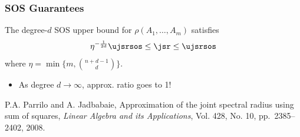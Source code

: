 \documentclass{beamer}
\begin{document}
  \begin{frame}
      \frametitle{SOS Guarantees}
      The degree-$d$ SOS upper bound for $\rho(A_1, \ldots,A_m)$ satisfies
      \[ \eta^{-\frac{1}{2d}} \ujsrsos \leq \jsr \leq \ujsrsos \]
      where $\eta = \min\Big\{m, {n+d-1 \choose d}\Big\}$.
      \begin{itemize}
          \item As degree $d \to \infty$, approx. ratio goes to 1!
      \end{itemize}
      \vfill
      {\scriptsize
      P.A. Parrilo and A. Jadbabaie,
      Approximation of the joint spectral radius using sum of squares,
      \emph{Linear Algebra and its Applications},
      Vol. 428, No. 10, pp.~2385--2402, 2008.
      }
  \end{frame}
\end{document}
